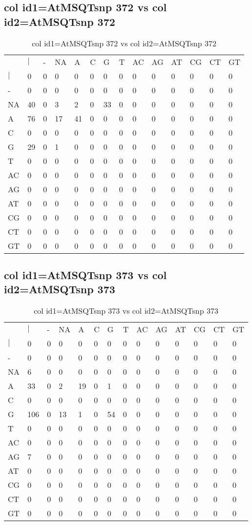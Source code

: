 \subsection{col id1=AtMSQTsnp 372 vs col id2=AtMSQTsnp 372}
\begin{center}
\begin{longtable}{|l|l|l|l|l|l|l|l|l|l|l|l|l|l|}
\caption{col id1=AtMSQTsnp 372 vs col id2=AtMSQTsnp 372} \label{table_dm688}\\
\hline
\\
\hline
&$|$&-&NA&A&C&G&T&AC&AG&AT&CG&CT&GT\\
$|$&0&0&0&0&0&0&0&0&0&0&0&0&0\\
-&0&0&0&0&0&0&0&0&0&0&0&0&0\\
NA&40&0&3&2&0&33&0&0&0&0&0&0&0\\
A&76&0&17&41&0&0&0&0&0&0&0&0&0\\
C&0&0&0&0&0&0&0&0&0&0&0&0&0\\
G&29&0&1&0&0&0&0&0&0&0&0&0&0\\
T&0&0&0&0&0&0&0&0&0&0&0&0&0\\
AC&0&0&0&0&0&0&0&0&0&0&0&0&0\\
AG&0&0&0&0&0&0&0&0&0&0&0&0&0\\
AT&0&0&0&0&0&0&0&0&0&0&0&0&0\\
CG&0&0&0&0&0&0&0&0&0&0&0&0&0\\
CT&0&0&0&0&0&0&0&0&0&0&0&0&0\\
GT&0&0&0&0&0&0&0&0&0&0&0&0&0\\
\hline
\end{longtable}
\end{center}

\subsection{col id1=AtMSQTsnp 373 vs col id2=AtMSQTsnp 373}
\begin{center}
\begin{longtable}{|l|l|l|l|l|l|l|l|l|l|l|l|l|l|}
\caption{col id1=AtMSQTsnp 373 vs col id2=AtMSQTsnp 373} \label{table_dm690}\\
\hline
\\
\hline
&$|$&-&NA&A&C&G&T&AC&AG&AT&CG&CT&GT\\
$|$&0&0&0&0&0&0&0&0&0&0&0&0&0\\
-&0&0&0&0&0&0&0&0&0&0&0&0&0\\
NA&6&0&0&0&0&0&0&0&0&0&0&0&0\\
A&33&0&2&19&0&1&0&0&0&0&0&0&0\\
C&0&0&0&0&0&0&0&0&0&0&0&0&0\\
G&106&0&13&1&0&54&0&0&0&0&0&0&0\\
T&0&0&0&0&0&0&0&0&0&0&0&0&0\\
AC&0&0&0&0&0&0&0&0&0&0&0&0&0\\
AG&7&0&0&0&0&0&0&0&0&0&0&0&0\\
AT&0&0&0&0&0&0&0&0&0&0&0&0&0\\
CG&0&0&0&0&0&0&0&0&0&0&0&0&0\\
CT&0&0&0&0&0&0&0&0&0&0&0&0&0\\
GT&0&0&0&0&0&0&0&0&0&0&0&0&0\\
\hline
\end{longtable}
\end{center}

